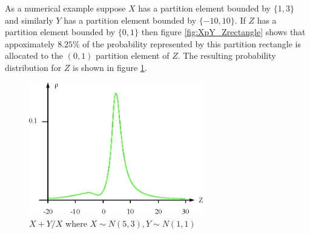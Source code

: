 As a numerical example suppose $X$ has a partition element bounded by $\{1,3\}$ and similarly $Y$ has a partition element bounded by $\{-10,10\}$. If $Z$ has a partition element bounded by $\{0,1\}$ then figure \ref{fig:XpY_Zrectangle} shows that appoximately $8.25\%$ of the probability represented by this partition rectangle is allocated to the $(0,1)$ partition element of $Z$. The resulting probability distribution for $Z$ is shown in figure \ref{fig:XpY_X_Z}.

\begin{figure}
  \centering
  \includegraphics[width=3in]{Images/XpY_X_Z.eps}
  \caption[$X+Y/X$ where $X\sim N(5,3), Y \sim N(1,1)$]
          {$X+Y/X$ where $X\sim N(5,3), Y \sim N(1,1)$}
  \label{fig:XpY_X_Z}
\end{figure}

